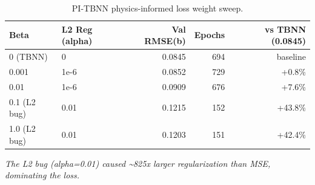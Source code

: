 \begin{table}[htbp]
\centering
\caption{PI-TBNN physics-informed loss weight sweep.}
\label{tab:pi_tbnn_sweep}
\begin{tabular}{llrrr}
\toprule
\textbf{Beta} & \textbf{L2 Reg (alpha)} & \textbf{Val RMSE(b)} & \textbf{Epochs} & \textbf{vs TBNN (0.0845)} \\
\midrule
0 (TBNN) & 0 & 0.0845 & 694 & baseline \\
0.001 & 1e-6 & 0.0852 & 729 & +0.8\% \\
0.01 & 1e-6 & 0.0909 & 676 & +7.6\% \\
0.1 (L2 bug) & 0.01 & 0.1215 & 152 & +43.8\% \\
1.0 (L2 bug) & 0.01 & 0.1203 & 151 & +42.4\% \\
\bottomrule
\end{tabular}
\vspace{2pt}
\begin{minipage}{\linewidth}
\footnotesize
\textit{The L2 bug (alpha=0.01) caused \textasciitilde{}825x larger regularization than MSE, dominating the loss.}
\\
\end{minipage}
\end{table}
